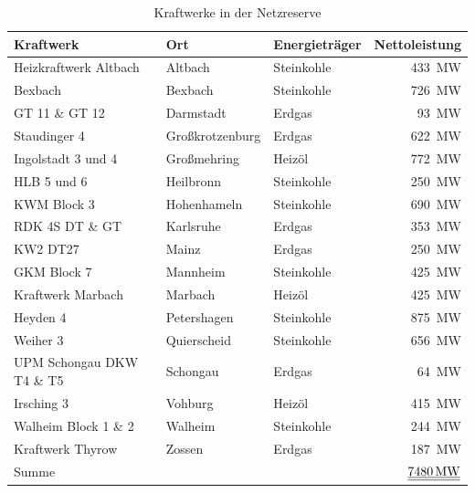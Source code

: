 			\begin{longtable}{lllr}
				\caption{Kraftwerke in der Netzreserve \cite{Excel_Kraftwerksliste}}			
				\label{Tab. Kraftwerke Netzreserve} \\
				\hline
				Kraftwerk & Ort & Energieträger & Nettoleistung \\ \hline 
				Heizkraftwerk Altbach & Altbach & Steinkohle & \SI{433}{\mega\watt} \\
				Bexbach & Bexbach & Steinkohle & \SI{726}{\mega\watt} \\
				GT 11 \& GT 12 & Darmstadt & Erdgas & \SI{93}{\mega\watt} \\
				Staudinger 4 & Großkrotzenburg & Erdgas & \SI{622}{\mega\watt} \\
				Ingolstadt 3 und 4 & Großmehring & Heizöl & \SI{772}{\mega\watt} \\
				HLB 5 und 6 & Heilbronn & Steinkohle & \SI{250}{\mega\watt} \\
				KWM Block 3 & Hohenhameln & Steinkohle & \SI{690}{\mega\watt} \\ 
				RDK 4S DT \& GT & Karlsruhe & Erdgas & \SI{353}{\mega\watt} \\
				KW2 DT27 & Mainz & Erdgas & \SI{250}{\mega\watt} \\
				GKM Block 7 & Mannheim & Steinkohle & \SI{425}{\mega\watt} \\
				Kraftwerk Marbach & Marbach & Heizöl & \SI{425}{\mega\watt} \\
				Heyden 4 & Petershagen & Steinkohle & \SI{875}{\mega\watt} \\
				Weiher 3 & Quierscheid & Steinkohle & \SI{656}{\mega\watt} \\
				UPM Schongau DKW T4 \& T5 & Schongau & Erdgas & \SI{64}{\mega\watt} \\
				Irsching 3 & Vohburg & Heizöl & \SI{415}{\mega\watt} \\
				Walheim Block 1 \& 2 & Walheim & Steinkohle & \SI{244}{\mega\watt} \\
				Kraftwerk Thyrow & Zossen & Erdgas & \SI{187}{\mega\watt} \\ \hline
				Summe &  &  & $\underline{\underline{\SI{7480}{\mega\watt}}}$ \\ \hline
			\end{longtable}
			
